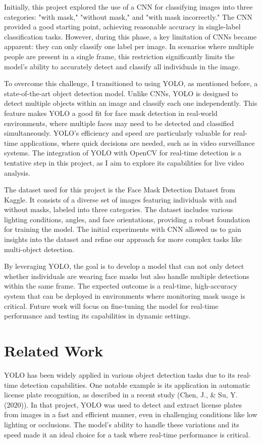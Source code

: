 \documentclass[11pt]{article}
\begin{document}
Initially, this project explored the use of a CNN for classifying images into three categories: "with mask," "without mask," and "with mask incorrectly." The CNN provided a good starting point, achieving reasonable accuracy in single-label classification tasks. However, during this phase, a key limitation of CNNs became apparent: they can only classify one label per image. In scenarios where multiple people are present in a single frame, this restriction significantly limits the model's ability to accurately detect and classify all individuals in the image.

To overcome this challenge, I transitioned to using YOLO, as mentioned before, a state-of-the-art object detection model. Unlike CNNs, YOLO is designed to detect multiple objects within an image and classify each one independently. This feature makes YOLO a good fit for face mask detection in real-world environments, where multiple faces may need to be detected and classified simultaneously. YOLO’s efficiency and speed are particularly valuable for real-time applications, where quick decisions are needed, such as in video surveillance systems. The integration of YOLO with OpenCV for real-time detection is a tentative step in this project, as I aim to explore its capabilities for live video analysis.

The dataset used for this project is the Face Mask Detection Dataset from Kaggle. It consists of a diverse set of images featuring individuals with and without masks, labeled into three categories. The dataset includes various lighting conditions, angles, and face orientations, providing a robust foundation for training the model. The initial experiments with CNN allowed us to gain insights into the dataset and refine our approach for more complex tasks like multi-object detection.

By leveraging YOLO, the goal is to develop a model that can not only detect whether individuals are wearing face masks but also handle multiple detections within the same frame. The expected outcome is a real-time, high-accuracy system that can be deployed in environments where monitoring mask usage is critical. Future work will focus on fine-tuning the model for real-time performance and testing its capabilities in dynamic settings.

\section{Related Work}

YOLO has been widely applied in various object detection tasks due to its real-time detection capabilities. One notable example is its application in automatic license plate recognition, as described in a recent study (Chen, J., \& Su, Y. (2020)). In that project, YOLO was used to detect and extract license plates from images in a fast and efficient manner, even in challenging conditions like low lighting or occlusions. The model's ability to handle these variations and its speed made it an ideal choice for a task where real-time performance is critical.
\end{document}
